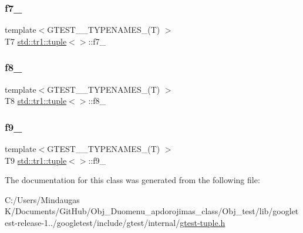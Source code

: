 \mbox{\label{classstd_1_1tr1_1_1tuple_a7c28780e616d382833e844f62672c6bc}} 
\subsubsection{\texorpdfstring{f7\_}{f7\_}}
{\footnotesize\ttfamily template$<$G\+T\+E\+S\+T\+\_\+\_\+\+T\+Y\+P\+E\+N\+A\+M\+E\+S\+\_\+(\+T) $>$ \\
T7 \mbox{\hyperlink{classstd_1_1tr1_1_1tuple}{std\+::tr1\+::tuple}}$<$$>$\+::f7\+\_\+}

\mbox{\label{classstd_1_1tr1_1_1tuple_ae859012c83943e54e035a4a32089ccb6}} 
\subsubsection{\texorpdfstring{f8\_}{f8\_}}
{\footnotesize\ttfamily template$<$G\+T\+E\+S\+T\+\_\+\_\+\+T\+Y\+P\+E\+N\+A\+M\+E\+S\+\_\+(\+T) $>$ \\
T8 \mbox{\hyperlink{classstd_1_1tr1_1_1tuple}{std\+::tr1\+::tuple}}$<$$>$\+::f8\+\_\+}

\mbox{\label{classstd_1_1tr1_1_1tuple_a336d5e582fd34e45ec88c78d473671dd}} 
\subsubsection{\texorpdfstring{f9\_}{f9\_}}
{\footnotesize\ttfamily template$<$G\+T\+E\+S\+T\+\_\+\_\+\+T\+Y\+P\+E\+N\+A\+M\+E\+S\+\_\+(\+T) $>$ \\
T9 \mbox{\hyperlink{classstd_1_1tr1_1_1tuple}{std\+::tr1\+::tuple}}$<$$>$\+::f9\+\_\+}



The documentation for this class was generated from the following file\+:\begin{DoxyCompactItemize}
\item 
C\+:/\+Users/\+Mindaugas K/\+Documents/\+Git\+Hub/\+Obj\+\_\+\+Duomenu\+\_\+apdorojimas\+\_\+class/\+Obj\+\_\+test/lib/googletest-\/release-\/1../googletest/include/gtest/internal/\mbox{\hyperlink{gtest-tuple_8h}{gtest-\/tuple.\+h}}\end{DoxyCompactItemize}
